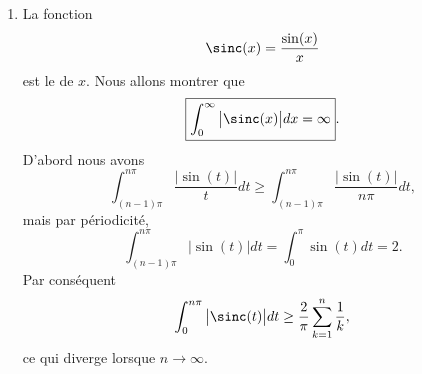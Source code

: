 \begin{enumerate}
	\item

	      La fonction
	      \begin{equation}
		      \sinc(x)=\frac{ \sin(x) }{ x }
	      \end{equation}
	      est le  de \( x\). Nous allons montrer que
	      \begin{equation}    \label{EqKNOmLEd}
		      \boxed{  \int_0^{\infty}\big| \sinc(x) \big|dx=\infty  }.
	      \end{equation}
	      D'abord nous avons
	      \begin{equation}
		      \int_{(n-1)\pi}^{n\pi}\frac{ \big| \sin(t) \big| }{ t }dt\geq \int_{(n-1)\pi}^{n\pi}\frac{ \big| \sin(t) \big| }{ n\pi }dt,
	      \end{equation}
	      mais par périodicité,
	      \begin{equation}
		      \int_{(n-1)\pi}^{n\pi}\big| \sin(t) \big|dt=\int_0^{\pi}\sin(t)dt=2.
	      \end{equation}
	      Par conséquent
	      \begin{equation}
		      \int_0^{n\pi}\big| \sinc(t) \big|dt\geq \frac{ 2 }{ \pi }\sum_{k=1}^n\frac{1}{ k },
	      \end{equation}
	      ce qui diverge lorsque \( n\to \infty\).


\end{enumerate}
